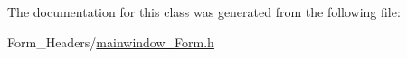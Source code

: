 The documentation for this class was generated from the following file\+:\begin{DoxyCompactItemize}
\item 
Form\+\_\+\+Headers/\mbox{\hyperlink{mainwindow___form_8h}{mainwindow\+\_\+\+Form.\+h}}\end{DoxyCompactItemize}
